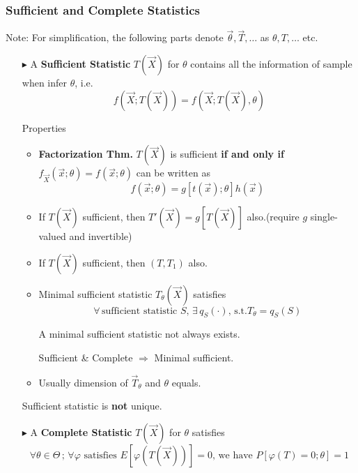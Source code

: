 \subsubsection{Sufficient and Complete Statistics}\label{SubSectionSufficient_CompleteStatistics}
    Note: For simplification, the following parts denote $\vec{\theta},\vec{T},\ldots$  as $\theta,T,\ldots$ etc.
    \begin{itemize}
        \item[$\blacktriangleright$] A \textbf{Sufficient Statistic} $T(\vec{X})$ for $\theta$ contains all the information of sample when infer $\theta$, i.e.
        \[
            f(\vec{X};T(\vec{X}))=f(\vec{X};T(\vec{X}),\theta)
        \]

        Properties
        \begin{itemize}
            \item \textbf{Factorization Thm.} $T(\vec{X})$ is sufficient \textbf{if and only if} $f_{\vec{X}}(\vec{x};\theta)=f(\vec{x};\theta)$ can be written as 
            \[
                f(\vec{x};\theta)=g[t(\vec{x});\theta]h(\vec{x})
            \]            
            \item If $T(\vec{X})$ sufficient, then $T'(\vec{X})=g[T(\vec{X})]$ also.(require $g$ single-valued and invertible)
            \item If $T(\vec{X})$ sufficient, then $(T,T_1)$ also.
            \item Minimal sufficient statistic $T_\theta(\vec{X})$ satisfies 
            \[
                \forall\,\text{sufficient statistic }S,\,\exists\, q_S(\cdot),\, \text{s.t.} T_\theta=q_S(S)
            \]

            A minimal sufficient statistic not always exists.

            Sufficient \& Complete $\Rightarrow $ Minimal sufficient.
            \item Usually dimension of $\vec{T}_\theta$ and $\theta$ equals.
        \end{itemize}
        
        Sufficient statistic is \textbf{not} unique.



        \item[$\blacktriangleright$] A \textbf{Complete Statistic} $T(\vec{X})$ for $\theta$ satisfies
        \[
            \forall\theta\in\Theta\, ;\,\forall\varphi\text{ satisfies }E[\varphi(T(\vec{X}))]=0\text{, we have }P[\varphi(T)=0;\theta]=1
        \]


\end{itemize}
